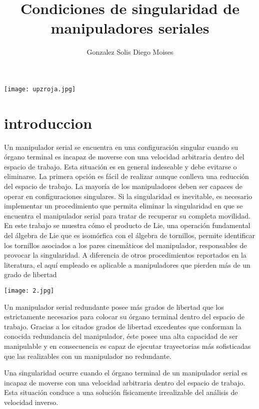 \documentclass[12pt,a4paper]{article}
\author{Gonzalez Solis Diego Moises}
\title{Condiciones de singularidad de manipuladores seriales}
\begin{document}
\maketitle
\texttt{[image: upzroja.jpg]} 
\newpage
\section{introduccion}
Un manipulador serial se encuentra en una configuración singular cuando su órgano terminal es incapaz de moverse con una
velocidad arbitraria dentro del espacio de trabajo. Esta situación es en general indeseable y debe evitarse o eliminarse. La primera
opción es fácil de realizar aunque conlleva una reducción del espacio de trabajo. La mayoría de los manipuladores deben ser
capaces de operar en configuraciones singulares. Si la singularidad es inevitable, es necesario implementar un procedimiento que
permita eliminar la singularidad en que se encuentra el manipulador serial para tratar de recuperar su completa movilidad. En este
trabajo se muestra cómo el producto de Lie, una operación fundamental del álgebra de Lie que es isomórfica con el álgebra de
tornillos, permite identificar los tornillos asociados a los pares cinemáticos del manipulador, responsables de provocar la singularidad. A diferencia de otros procedimientos reportados en la literatura, el aquí empleado es aplicable a manipuladores que pierden más de un grado de libertad

\texttt{[image: 2.jpg]} 

Un manipulador serial redundante posee más
grados de libertad que los estrictamente necesarios para colocar su órgano terminal dentro
del espacio de trabajo. Gracias a los citados
grados de libertad excedentes que conforman la
conocida redundancia del manipulador, éste
posee una alta capacidad de ser manipulable y
en consecuencia es capaz de ejecutar trayectorias más sofisticadas que las realizables con un
manipulador no redundante.


Una singularidad ocurre cuando el órgano terminal de un manipulador serial es incapaz de
moverse con una velocidad arbitraria dentro del
espacio de trabajo. Esta situación conduce a una
solución físicamente irrealizable del análisis de
velocidad inverso.
\end{document}
